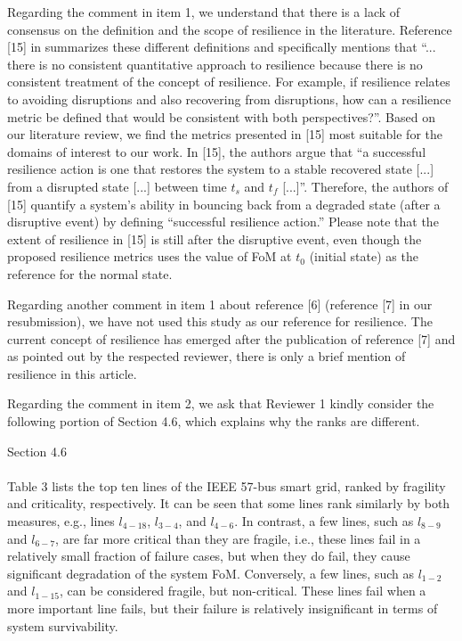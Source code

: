 \documentclass{article}
\newenvironment{response}{
  \doublespacing
  \setlength\parindent{0.05\linewidth}
  \ttfamily
}{}
\newenvironment{textblock}[1]
{\begin{tcolorbox}[breakable,enhanced]{#1 \\ \\}}
{\end{tcolorbox}}
\begin{document}
\begin{response}
Regarding the comment in item 1, we understand that there is a lack of consensus on the definition and the scope of resilience in the literature. Reference [15] in  summarizes these different definitions and specifically mentions that ``... there is no consistent quantitative approach to resilience because there is no consistent treatment of the concept of resilience. For example, if resilience relates to avoiding disruptions and also recovering from disruptions, how can a resilience metric be defined that would be consistent with both perspectives?''. Based on our literature review, we find the metrics presented in [15] most suitable for the domains of interest to our work. In [15], the authors argue that ``a successful resilience action is one that restores the system to a stable recovered state [...] from a disrupted state [...] between time $t_s$ and $t_f$ [...]''. Therefore, the authors of [15] quantify a system's ability in bouncing back from a degraded state (after a disruptive event) by defining ``successful resilience action.'' Please note that the extent of resilience in [15] is still after the disruptive event, even though the proposed resilience metrics uses the value of FoM at $t_0$ (initial state) as the reference for the normal state.

Regarding another comment in item 1 about reference [6] (reference [7] in our resubmission), we have not used this study as our reference for resilience. The current concept of resilience has emerged after the publication of reference [7] and as pointed out by the respected reviewer, there is only a brief mention of resilience in this article.

Regarding the comment in item 2, we ask that Reviewer 1 kindly consider the following portion of Section 4.6, which explains why the ranks are different.

\begin{textblock}{Section 4.6}
Table 3 lists the top ten lines of the IEEE 57-bus smart grid, ranked by fragility and criticality, respectively. It can be seen that some lines rank similarly by both measures, e.g., lines $l_{4-18}$, $l_{3-4}$, and $l_{4-6}$. In contrast, a few lines, such as $l_{8-9}$ and $l_{6-7}$, are far more critical than they are fragile, i.e., these lines fail in a relatively small fraction of failure cases, but when they do fail, they cause significant degradation of the system FoM. Conversely, a few lines, such as $l_{1-2}$ and $l_{1-15}$, can be considered fragile, but non-critical. These lines fail when a more important line fails, but their failure is relatively insignificant in terms of system survivability.
\end{textblock}


\end{response}
\end{document}
